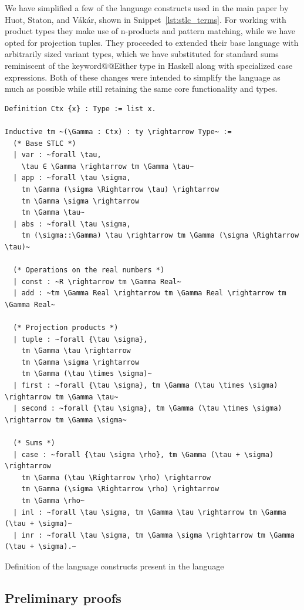 \documentclass[11pt, final]{article}
\makeatletter
\def\Vakar{V\'{a}k\'{a}r}
\def\<#1>{\csname keyword@@#1\endcsname}
\makeatother
\begin{document}
We have simplified a few of the language constructs used in the main paper by Huot, Staton, and \Vakar{}\cite{huot2020correctness}, shown in Snippet~\ref{lst:stlc_terms}. For working with product types they make use of n-products and pattern matching, while we have opted for projection tuples. They proceeded to extended their base language with arbitrarily sized variant types, which we have substituted for standard sums reminiscent of the \<Either> type in Haskell along with specialized case expressions. Both of these changes were intended to simplify the language as much as possible while still retaining the same core functionality and types.

\begin{listing}
  \begin{verbatim}
Definition Ctx {x} : Type := list x.

Inductive tm ~(\Gamma : Ctx) : ty \rightarrow Type~ :=
  (* Base STLC *)
  | var : ~forall \tau,
    \tau ∈ \Gamma \rightarrow tm \Gamma \tau~
  | app : ~forall \tau \sigma,
    tm \Gamma (\sigma \Rightarrow \tau) \rightarrow
    tm \Gamma \sigma \rightarrow
    tm \Gamma \tau~
  | abs : ~forall \tau \sigma,
    tm (\sigma::\Gamma) \tau \rightarrow tm \Gamma (\sigma \Rightarrow \tau)~

  (* Operations on the real numbers *)
  | const : ~R \rightarrow tm \Gamma Real~
  | add : ~tm \Gamma Real \rightarrow tm \Gamma Real \rightarrow tm \Gamma Real~

  (* Projection products *)
  | tuple : ~forall {\tau \sigma},
    tm \Gamma \tau \rightarrow
    tm \Gamma \sigma \rightarrow
    tm \Gamma (\tau \times \sigma)~
  | first : ~forall {\tau \sigma}, tm \Gamma (\tau \times \sigma) \rightarrow tm \Gamma \tau~
  | second : ~forall {\tau \sigma}, tm \Gamma (\tau \times \sigma) \rightarrow tm \Gamma \sigma~

  (* Sums *)
  | case : ~forall {\tau \sigma \rho}, tm \Gamma (\tau + \sigma) \rightarrow
    tm \Gamma (\tau \Rightarrow \rho) \rightarrow
    tm \Gamma (\sigma \Rightarrow \rho) \rightarrow
    tm \Gamma \rho~
  | inl : ~forall \tau \sigma, tm \Gamma \tau \rightarrow tm \Gamma (\tau + \sigma)~
  | inr : ~forall \tau \sigma, tm \Gamma \sigma \rightarrow tm \Gamma (\tau + \sigma).~

  \end{verbatim}
  \caption{Definition of the language constructs present in the language}
  \label{lst:stlc_terms}
\end{listing}

\subsection{Preliminary proofs}
\end{document}
